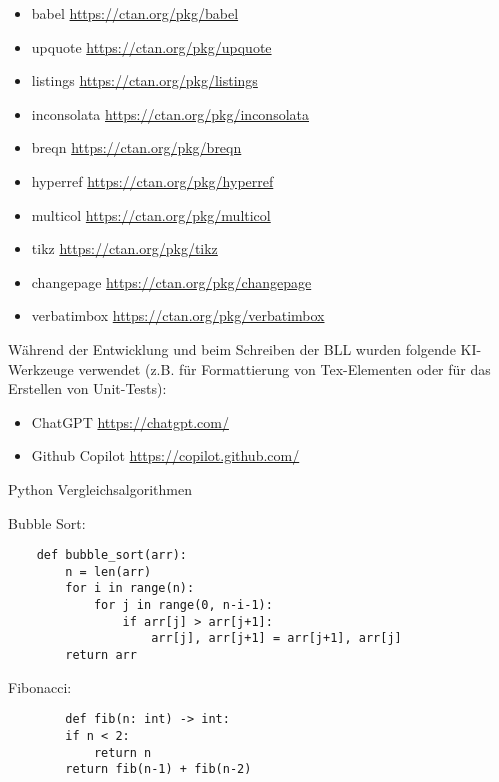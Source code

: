     \begin{itemize}
        \item babel \url{https://ctan.org/pkg/babel}
        \item upquote \url{https://ctan.org/pkg/upquote}
        \item listings \url{https://ctan.org/pkg/listings}
        \item inconsolata \url{https://ctan.org/pkg/inconsolata}
        \item breqn \url{https://ctan.org/pkg/breqn}
        \item hyperref \url{https://ctan.org/pkg/hyperref}
        \item multicol \url{https://ctan.org/pkg/multicol}
        \item tikz \url{https://ctan.org/pkg/tikz}
        \item changepage \url{https://ctan.org/pkg/changepage}
        \item verbatimbox \url{https://ctan.org/pkg/verbatimbox}
    \end{itemize}

    \noindent Während der Entwicklung und beim Schreiben der BLL wurden folgende KI-Werkzeuge verwendet (z.B. für Formattierung von Tex-Elementen oder für das Erstellen von Unit-Tests): 
    \begin{itemize}
        \item ChatGPT \url{https://chatgpt.com/}
        \item Github Copilot \url{https://copilot.github.com/}
    \end{itemize}


    \vspace{1cm}

    \noindent Python Vergleichsalgorithmen
    
    \noindent Bubble Sort:
    \begin{lstlisting}
    def bubble_sort(arr):
        n = len(arr)
        for i in range(n):
            for j in range(0, n-i-1):
                if arr[j] > arr[j+1]:
                    arr[j], arr[j+1] = arr[j+1], arr[j]
        return arr
    \end{lstlisting}

    \noindent Fibonacci:

    \begin{lstlisting}
        def fib(n: int) -> int:
        if n < 2:
            return n
        return fib(n-1) + fib(n-2)
    \end{lstlisting}

